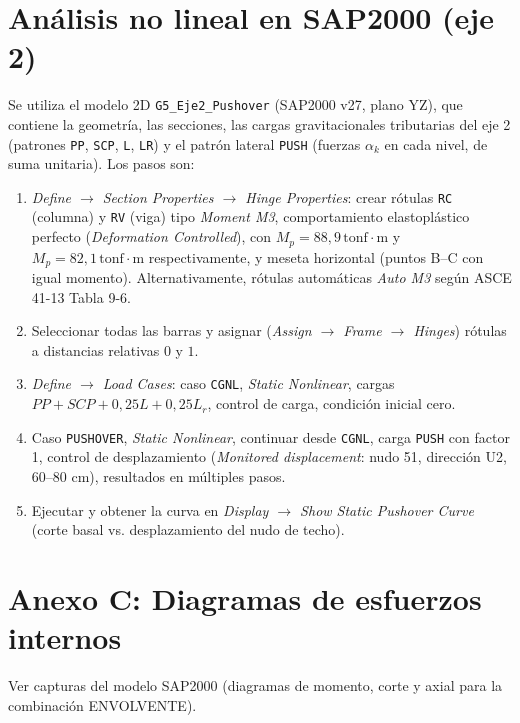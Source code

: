 \documentclass[11pt,letterpaper]{article}
\newcommand{\tonfm}{\,\mathrm{tonf\cdot m}}
\begin{document}
\section{Análisis no lineal en SAP2000 (eje 2)}
Se utiliza el modelo 2D \texttt{G5\_Eje2\_Pushover} (SAP2000 v27, plano YZ), que contiene la geometría, las secciones,
las cargas gravitacionales tributarias del eje 2 (patrones \texttt{PP}, \texttt{SCP}, \texttt{L}, \texttt{LR})
y el patrón lateral \texttt{PUSH} (fuerzas $\alpha_k$ en cada nivel, de suma unitaria). Los pasos son:
\begin{enumerate}
  \item \emph{Define $\rightarrow$ Section Properties $\rightarrow$ Hinge Properties}: crear rótulas
        \texttt{RC} (columna) y \texttt{RV} (viga) tipo \emph{Moment M3}, comportamiento elastoplástico perfecto
        (\emph{Deformation Controlled}), con $M_p = 88{,}9\tonfm$ y
        $M_p = 82{,}1\tonfm$ respectivamente, y meseta horizontal (puntos B--C con igual momento).
        Alternativamente, rótulas automáticas \emph{Auto M3} según ASCE 41-13 Tabla 9-6.
  \item Seleccionar todas las barras y asignar (\emph{Assign $\rightarrow$ Frame $\rightarrow$ Hinges}) rótulas a
        distancias relativas $0$ y $1$.
  \item \emph{Define $\rightarrow$ Load Cases}: caso \texttt{CGNL}, \emph{Static Nonlinear}, cargas
        $PP + SCP + 0{,}25L + 0{,}25L_r$, control de carga, condición inicial cero.
  \item Caso \texttt{PUSHOVER}, \emph{Static Nonlinear}, continuar desde \texttt{CGNL}, carga \texttt{PUSH} con
        factor 1, control de desplazamiento (\emph{Monitored displacement}: nudo 51, dirección U2, $60$--$80$ cm),
        resultados en múltiples pasos.
  \item Ejecutar y obtener la curva en \emph{Display $\rightarrow$ Show Static Pushover Curve} (corte basal vs.
        desplazamiento del nudo de techo).
\end{enumerate}

\section*{Anexo C: Diagramas de esfuerzos internos}
Ver capturas del modelo SAP2000 (diagramas de momento, corte y axial para la combinación ENVOLVENTE).
\end{document}
